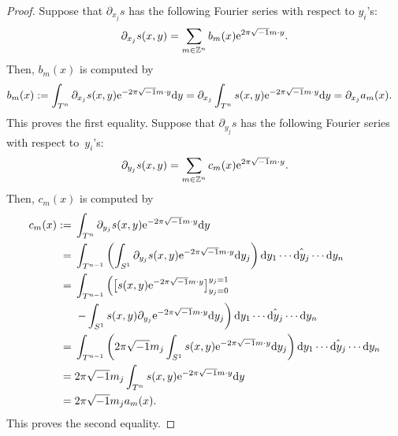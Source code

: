 \documentclass[10pt,a4paper]{amsart}
\numberwithin{equation}{section}
\newcommand{\Z}{\mathbb{Z}}
\begin{document}
\begin{proof}
Suppose that $\partial_{x_j}s$ has the following Fourier series with respect to $y_i$'s:
\begin{equation*}
\partial_{x_j}s(x,y)=\sum_{m\in \Z^n}b_m(x){\rm e}^{2\pi\sqrt{-1}m\cdot y}.
\end{equation*}
Then, $b_m(x)$ is computed by
\begin{align*}
b_m(x)&:=\int_{T^n}\partial_{x_j}s(x,y){\rm e}^{-2\pi\sqrt{-1}m\cdot y}{\rm d}y =\partial_{x_j}\int_{T^n}s(x,y){\rm e}^{-2\pi\sqrt{-1}m\cdot y}{\rm d}y=\partial_{x_j}a_m(x).
\end{align*}
This proves the first equality. Suppose that $\partial_{y_j}s$ has the following Fourier series with respect to~$y_i$'s:
\begin{equation*}
\partial_{y_j}s(x,y)=\sum_{m\in \Z^n}c_m(x){\rm e}^{2\pi\sqrt{-1}m\cdot y}.
\end{equation*}
Then, $c_m(x)$ is computed by
\begin{align*}
c_m(x):={}&\int_{T^n}\partial_{y_j}s(x,y){\rm e}^{-2\pi\sqrt{-1}m\cdot y}{\rm d}y\\
={}&\int_{T^{n-1}}
 \left(\int_{S^1}\partial_{y_j}s(x,y){\rm e}^{-2\pi\sqrt{-1}m\cdot y}{\rm d}y_j\right)
{\rm d}y_1\cdots \hat{{\rm d}y_j}\cdots {\rm d}y_n \\
={}& \int_{T^{n-1}} \left(\big[s(x,y){\rm e}^{-2\pi\sqrt{-1}m\cdot y}\big]_{y_j=0}^{y_j=1}\right.\\
&\left.- \int_{S^1}s(x,y)\partial_{y_j}{\rm e}^{-2\pi\sqrt{-1}m\cdot y}{\rm d}y_j\right){\rm d}y_1\cdots \hat{{\rm d}y_j}\cdots {\rm d}y_n \\
={}&\int_{T^{n-1}} \left(2\pi\sqrt{-1}m_j\int_{S^1}s(x,y){\rm e}^{-2\pi\sqrt{-1}m\cdot y}{\rm d}y_j\right){\rm d}y_1\cdots \hat{{\rm d}y_j}\cdots {\rm d}y_n \\
={}&2\pi\sqrt{-1}m_j\int_{T^n}s(x,y){\rm e}^{-2\pi\sqrt{-1}m\cdot y}{\rm d}y \\
={}& 2\pi\sqrt{-1}m_ja_m(x).
\end{align*}
This proves the second equality.
\end{proof}
\end{document}
